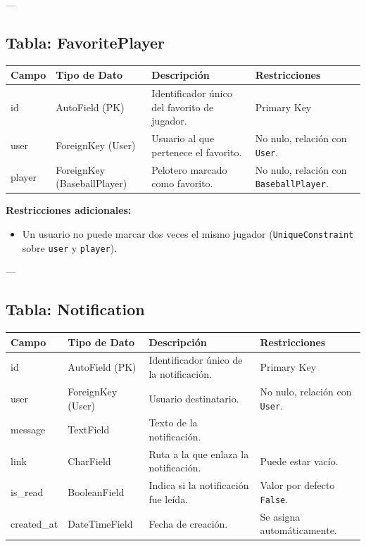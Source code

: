 \documentclass{report}
\begin{document}
    ---

    \subsection*{Tabla: FavoritePlayer}
    \begin{tabular}{|>{\raggedright\arraybackslash}p{3cm}|>{\raggedright\arraybackslash}p{3cm}|>{\raggedright\arraybackslash}p{6cm}|>{\raggedright\arraybackslash}p{4cm}|}
        \hline
        \textbf{Campo} & \textbf{Tipo de Dato} & \textbf{Descripción} & \textbf{Restricciones} \\
        \hline
        id & AutoField (PK) & Identificador único del favorito de jugador. & Primary Key \\
        \hline
        user & ForeignKey (User) & Usuario al que pertenece el favorito. & No nulo, relación con \texttt{User}. \\
        \hline
        player & ForeignKey (BaseballPlayer) & Pelotero marcado como favorito. & No nulo, relación con \texttt{BaseballPlayer}. \\
        \hline
    \end{tabular}

    \textbf{Restricciones adicionales:}
    \begin{itemize}
        \item Un usuario no puede marcar dos veces el mismo jugador (\texttt{UniqueConstraint} sobre \texttt{user} y \texttt{player}).
    \end{itemize}

    ---

    \subsection*{Tabla: Notification}
    \begin{tabular}{|>{\raggedright\arraybackslash}p{3cm}|>{\raggedright\arraybackslash}p{3cm}|>{\raggedright\arraybackslash}p{6cm}|>{\raggedright\arraybackslash}p{4cm}|}
        \hline
        \textbf{Campo} & \textbf{Tipo de Dato} & \textbf{Descripción} & \textbf{Restricciones} \\
        \hline
        id & AutoField (PK) & Identificador único de la notificación. & Primary Key \\
        \hline
        user & ForeignKey (User) & Usuario destinatario. & No nulo, relación con \texttt{User}. \\
        \hline
        message & TextField & Texto de la notificación. &  \\
        \hline
        link & CharField & Ruta a la que enlaza la notificación. & Puede estar vacío. \\
        \hline
        is\_read & BooleanField & Indica si la notificación fue leída. & Valor por defecto \texttt{False}. \\
        \hline
        created\_at & DateTimeField & Fecha de creación. & Se asigna automáticamente. \\
        \hline
    \end{tabular}
    
\end{document}
